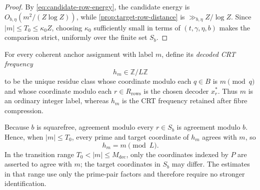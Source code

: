 \begin{proof}
By \cref{eq:candidate-row-energy}, the candidate energy is $O_{b,\eta}(m^2/(Z\log Z))$, while \cref{prop:target-row-distance} is $\gg_{b,\eta}Z/\log Z$.  Since $|m|\leq T_0\leq\kappa_0Z$, choosing $\kappa_0$ sufficiently small in terms of $(t,\gamma,\eta,b)$ makes the comparison strict, uniformly over the finite set $S_b$.
\end{proof}

For every coherent anchor assignment with label $m$, define its \emph{decoded CRT frequency}
\begin{equation}
\label{eq:h-m-definition}
 h_m\in\mathbb Z/L\mathbb Z
\end{equation}
to be the unique residue class whose coordinate modulo each $q\in B$ is $m\pmod q$ and whose coordinate modulo each $r\in R_{\mathrm{rows}}$ is the chosen decoder $x_r^*$.  Thus $m$ is an ordinary integer label, whereas $h_m$ is the CRT frequency retained after fibre compression.

Because $b$ is squarefree, agreement modulo every $r\in S_b$ is agreement modulo $b$.  Hence, when $|m|\leq T_0$, every prime and target coordinate of $h_m$ agrees with $m$, so
\begin{equation}
\label{eq:h-m-full-identification}
 h_m=m\pmod L.
\end{equation}
In the transition range $T_0<|m|\leq M_{\mathrm{dec}}$, only the coordinates indexed by $P$ are asserted to agree with $m$; the target coordinates in $S_b$ may differ.  The estimates in that range use only the prime-pair factors and therefore require no stronger identification.
